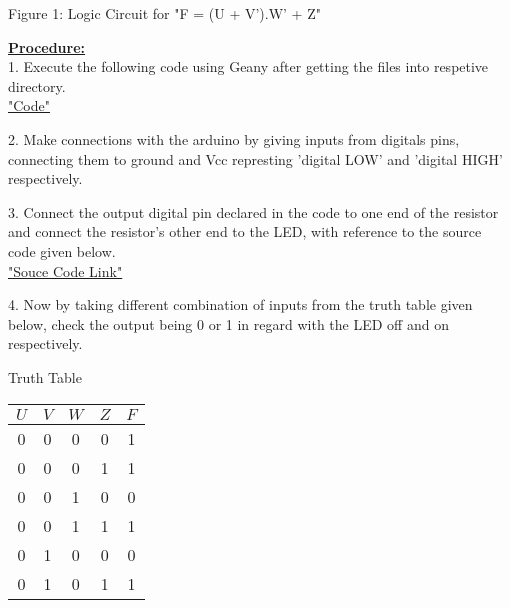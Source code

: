 \documentclass[10pt,a4paper]{report}
\begin{document}
\begin{multicols}{2}
\centering Figure 1: Logic Circuit for "F = (U + V').W' + Z" \vspace{15mm}
\\ \raggedright \large \textbf{\underline{Procedure:}} \normalsize \vspace{2mm}
\\ 1. Execute the following code using Geany after getting the files into respetive directory.
\\ \centering \underline{\href{https://github.com/BoleManideep/FWC_module1/tree/main/Assignements/assembly/codes}{"Code"}} \vspace{2mm}
\\ \raggedright 2. Make connections with the arduino by giving inputs from digitals pins, connecting them to ground and Vcc represting 'digital LOW' and 'digital HIGH' respectively. \vspace{2mm} 
\\ \raggedright 3. Connect the output digital pin declared in the code to one end of the resistor and connect the resistor's other end to the LED, with reference to the source code given below. \vspace{2mm}
\\ \centering \underline{\href{https://github.com/BoleManideep/FWC_module1/blob/main/Assignements/assembly/codes/Assignment.asm}{"Souce Code Link"}} \vspace{2mm}
\\ \raggedright 4. Now by taking different combination of inputs from the truth table given below, check the output being 0 or 1 in regard with the LED off and on respectively. \vspace{5mm}
\\ \begin{center}
	Truth Table \vspace{2mm} \\
    \setlength{\arrayrulewidth}{0.5mm}\setlength{\tabcolsep}{18pt}
\renewcommand{\arraystretch}{1.5}
    \begin{tabular}{|c|c|c|c|c|}
    \hline 
    \textbf{$U$} & \textbf{$V$} & \textbf{$W$} & \textbf{$Z$} & \textbf{$F$}\\
      \hline
      0 & 0 & 0 & 0 & 1\\
      0 & 0 & 0 & 1 & 1\\
      0 & 0 & 1 & 0 & 0\\
      0 & 0 & 1 & 1 & 1\\
      0 & 1 & 0 & 0 & 0\\
      0 & 1 & 0 & 1 & 1\\

\end{tabular}
\end{center}
\end{multicols}
\end{document}
